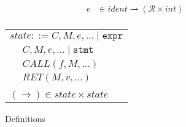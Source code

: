 \documentclass{article}
\begin{document}
\begin{figure}
\begin{minipage}[t]{0.49\textwidth}
\[\begin{aligned}
    e & \in \mathit{ident} \rightharpoonup (\mathcal{R} \times \mathit{int}) \\
    \end{aligned}\]
    \begin{tabular}{l | l}
      \multicolumn{2}{r}{\(\mathit{state} ::= C, M, e, \ldots \mid \mathtt{expr}\)} \\
      \hspace{4em} & \(C, M, e, \ldots \mid \mathtt{stmt}\) \\
      \hspace{4em} & \(\mathit{CALL}(f, M, \ldots)\)  \\
      \hspace{4em} & \(\mathit{RET}(M, v, \ldots)\) \\
      \multicolumn{2}{l}{} \\
      \multicolumn{2}{l}{\hspace{1.5em}\((\longrightarrow) \in \mathit{state} \times \mathit{state}\)} \\
    \end{tabular}
  \end{minipage}


  \caption{Definitions}
  \label{subfig:defs}
  \label{fig:memmod}
\end{figure}
\end{document}

